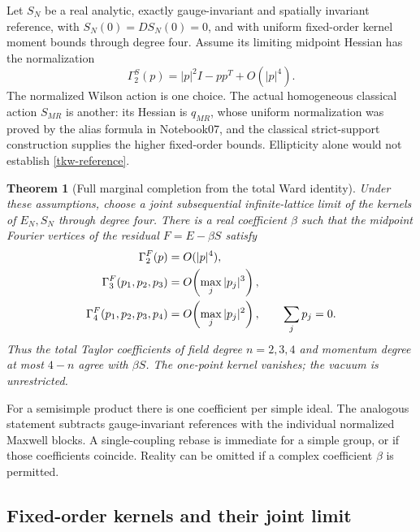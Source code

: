 \documentclass[11pt]{article}
\newtheorem{theorem}{Theorem}[section]
\theoremstyle{remark}
\begin{document}
Let \(S_N\) be a real analytic, exactly gauge-invariant and spatially
invariant reference, with \(S_N(0)=DS_N(0)=0\), and with uniform
fixed-order kernel moment bounds through degree four. Assume its
limiting midpoint Hessian has the normalization
\begin{equation}
 \Gamma_2^S(p)=|p|^2I-pp^T+O(|p|^4).
 \label{tkw-reference}
\end{equation}
The normalized Wilson action is one choice. The actual homogeneous
classical action \(S_{MR}\) is another: its Hessian is \(q_{MR}\),
whose uniform normalization was proved by the alias formula in
Notebook07, and the classical strict-support construction supplies
the higher fixed-order bounds. Ellipticity alone would not establish
\eqref{tkw-reference}.

\begin{theorem}[Full marginal completion from the total Ward identity]
\label{tkw-theorem}
Under these assumptions, choose a joint subsequential infinite-lattice
limit of the kernels of \(E_N,S_N\) through degree four. There is a real
coefficient \(\beta\) such that the midpoint Fourier vertices of the
residual \(F=E-\beta S\) satisfy
\begin{align}
 \Gamma_2^F(p)&=O(|p|^4),\notag\\
 \Gamma_3^F(p_1,p_2,p_3)
     &=O\!\left(\max_j|p_j|^3\right),\notag\\
 \Gamma_4^F(p_1,p_2,p_3,p_4)
     &=O\!\left(\max_j|p_j|^2\right),
 \qquad \sum_jp_j=0.
 \label{tkw-remainders}
\end{align}
Thus the total Taylor coefficients of field degree \(n=2,3,4\)
and momentum degree at most \(4-n\) agree with \(\beta S\).
The one-point kernel vanishes; the vacuum is unrestricted.
\end{theorem}

For a semisimple product there is one coefficient per simple ideal.
The analogous statement subtracts gauge-invariant references with the
individual normalized Maxwell blocks. A single-coupling rebase is
immediate for a simple group, or if those coefficients coincide.
Reality can be omitted if a complex coefficient \(\beta\) is permitted.

\subsection{Fixed-order kernels and their joint limit}
\label{tkw-kernel-limit}
\end{document}

